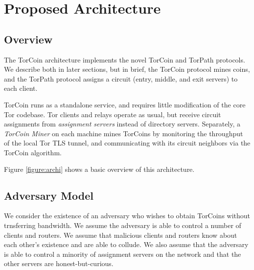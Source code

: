 \section{Proposed Architecture} \label{arch}

\subsection{Overview}



The TorCoin architecture implements the novel TorCoin and TorPath protocols. We
describe both in later sections, but in brief, the TorCoin protocol mines coins,
and the TorPath protocol assigns a circuit (entry, middle, and exit servers) to
each client.

TorCoin runs as a standalone service, and requires little modification of the
core Tor codebase. Tor clients and relays operate as usual, but receive circuit
assignments from \textit{assignment servers} instead of directory  servers.
Separately, a \textit{TorCoin Miner} on each machine mines TorCoins by
monitoring the throughput of the local Tor TLS tunnel, and communicating with
its circuit neighbors via the TorCoin algorithm.

Figure \ref{figure:archi} shows a basic overview of this architecture.


\subsection{Adversary Model} We consider the existence of an adversary who
wishes to obtain TorCoins without trnsferring bandwidth. We assume the adversary
is able to control a number of clients and routers. We assume that malicious
clients and routers know about each other's existence and are able to collude.
We also assume that the adversary is able to control a minority of assignment
servers on the network and that the other servers are honest-but-curious.